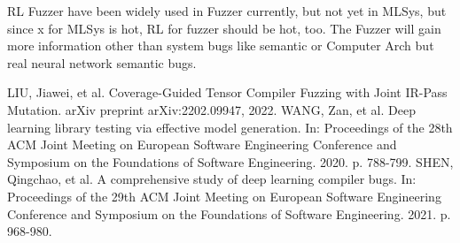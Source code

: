 \documentclass[conference]{IEEEtran}
\begin{document}
RL Fuzzer have been widely used in Fuzzer currently, but not yet in MLSys, but since x for MLSys is hot, RL for fuzzer should be hot, too. The Fuzzer will gain more information other than system bugs like semantic or Computer Arch but real neural network semantic bugs.
  
\begin{thebibliography}{00}
     LIU, Jiawei, et al. Coverage-Guided Tensor Compiler Fuzzing with Joint IR-Pass Mutation. arXiv preprint arXiv:2202.09947, 2022.
     WANG, Zan, et al. Deep learning library testing via effective model generation. In: Proceedings of the 28th ACM Joint Meeting on European Software Engineering Conference and Symposium on the Foundations of Software Engineering. 2020. p. 788-799.
     SHEN, Qingchao, et al. A comprehensive study of deep learning compiler bugs. In: Proceedings of the 29th ACM Joint Meeting on European Software Engineering Conference and Symposium on the Foundations of Software Engineering. 2021. p. 968-980.
\end{thebibliography}
\end{document}

